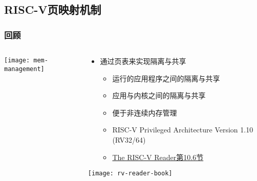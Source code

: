 \subsection{RISC-V页映射机制} %


\begin{frame}   
	\frametitle{回顾}
	
	\begin{columns}
		
		\begin{column}{.5\textwidth}
			
			\texttt{[image: mem-management]}
			
		\end{column}
		
		
		\begin{column}{.5\textwidth}
			
			\begin{itemize}\large
				\item 通过页表来实现隔离与共享
				\begin{itemize}
					\item 运行的应用程序之间的隔离与共享
					\item 应用与内核之间的隔离与共享
					\item 便于非连续内存管理						
					\item RISC-V Privileged Architecture Version 1.10 (RV32/64)
					\item \href{http://crva.ict.ac.cn/documents/RISC-V-Reader-Chinese-v2p1.pdf}{The RISC-V Reader第10.6节}	
				\end{itemize}
			\end{itemize}
			\centering
			\texttt{[image: rv-reader-book]}
		\end{column}
		
		
	\end{columns}
	
\end{frame}

